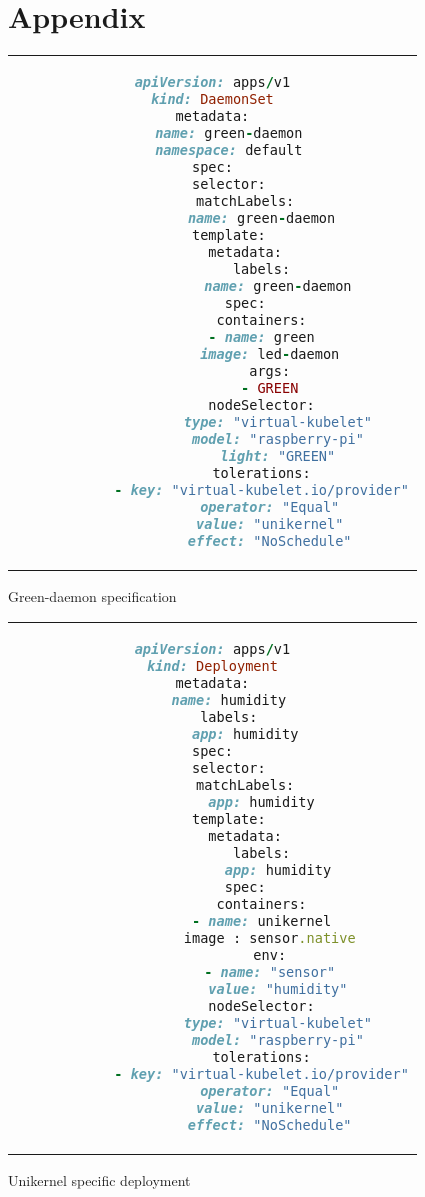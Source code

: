 \chapter{Appendix} \label{chapter: Appendix}

\begin{code}[htpb]
    \centering
    \begin{tabular}{c}
    \begin{lstlisting}[language=ruby]
apiVersion: apps/v1
kind: DaemonSet
metadata:
    name: green-daemon
    namespace: default
spec:
    selector:
        matchLabels:
            name: green-daemon
    template:
        metadata:
            labels:
                name: green-daemon
        spec:
            containers:
            - name: green
              image: led-daemon
              args:
              - GREEN
            nodeSelector:
                type: "virtual-kubelet"
                model: "raspberry-pi"
                light: "GREEN"
            tolerations:
            - key: "virtual-kubelet.io/provider"
              operator: "Equal"
              value: "unikernel"
              effect: "NoSchedule"
  \end{lstlisting}
  \end{tabular}
  \caption{Green-daemon specification}\label{fig:green-daemon}
  \end{code}


\begin{code}[htpb]
    \centering
    \begin{tabular}{c}
    \begin{lstlisting}[language=ruby]
apiVersion: apps/v1
kind: Deployment
metadata:
    name: humidity
    labels:
        app: humidity
spec:
    selector:
        matchLabels:
            app: humidity
    template:
        metadata:
            labels:
                app: humidity
        spec:
            containers:
            - name: unikernel
              image : sensor.native
              env:
              - name: "sensor"
                value: "humidity"
            nodeSelector:
                type: "virtual-kubelet"
                model: "raspberry-pi"
            tolerations:
            - key: "virtual-kubelet.io/provider"
              operator: "Equal"
              value: "unikernel"
              effect: "NoSchedule"
\end{lstlisting}
\end{tabular}
\caption{Unikernel specific deployment}\label{fig:unikernel-dep}
\end{code}


